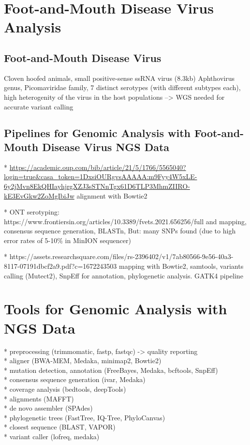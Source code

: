 \section{Foot-and-Mouth Disease Virus Analysis}
\subsection{Foot-and-Mouth Disease Virus}
Cloven hoofed animals,
small positive-sense ssRNA virus (8.3kb)
Aphthovirus genus, Picomaviridae family, 7 distinct serotypes (with different subtypes each),
high heterogenity of the virus in the host populations --> WGS needed for accurate variant calling

\subsection{Pipelines for Genomic Analysis with Foot-and-Mouth Disease Virus NGS Data}
* \url{https://academic.oup.com/bib/article/21/5/1766/5565040?login=true&casa_token=1DxsiOURgvsAAAAA:m9Fyy4W5xLE-6y2jMvn8EkQHIayhjrgXZJ3sSTNnTgx61D6TLP3MhmZIIRO-kE3EvGkw2ZoMgIbiJw} alignment with Bowtie2

* ONT serotyping: https://www.frontiersin.org/articles/10.3389/fvets.2021.656256/full and mapping, consensus sequence generation, BLASTn, But: many SNPs found (due to high error rates of 5-10\% in MinION sequencer)

* https://assets.researchsquare.com/files/rs-2396402/v1/7ab80566-9e56-40a3-8117-07191dbcf2a9.pdf?c=1672243503 mapping with Bowtie2, samtools, variants calling (Mutect2), SnpEff for annotation, phylogenetic analysis. GATK4 pipeline

\section{Tools for Genomic Analysis with NGS Data}
* preprocessing (trimmomatic, fastp, fastqc) -> quality reporting \\
* aligner (BWA-MEM, Medaka, minimap2, Bowtie2) \\
* mutation detection, annotation (FreeBayes, Medaka, bcftools, SnpEff) \\
* consensus sequence generation (ivar, Medaka) \\
* coverage analysis (bedtools, deepTools) \\
* alignments (MAFFT) \\
* de novo assembler (SPAdes) \\
* phylogenetic trees (FastTree, IQ-Tree, PhyloCanvas) \\
* closest sequence (BLAST, VAPOR) \\
* variant caller (lofreq, medaka)

